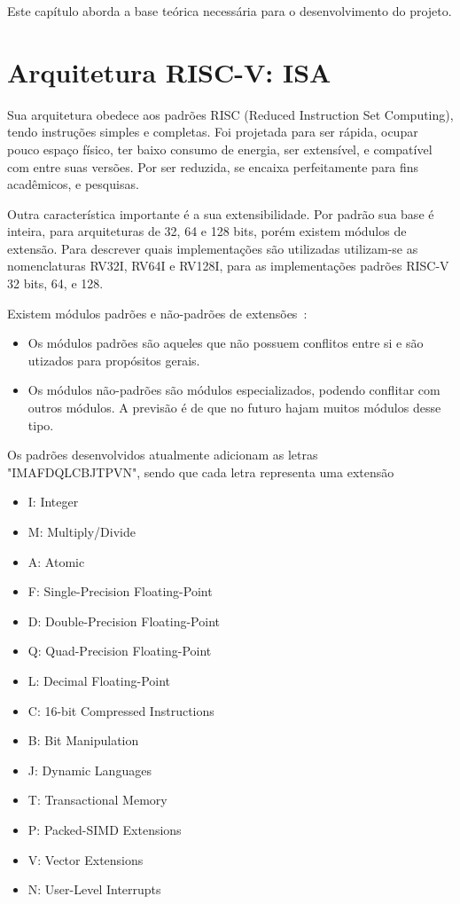 Este capítulo aborda a base teórica necessária para o desenvolvimento do projeto.

\section{Arquitetura RISC-V: ISA}

	Sua arquitetura obedece aos padrões RISC (Reduced Instruction Set Computing), tendo instruções simples e completas. Foi projetada para ser rápida, ocupar pouco espaço físico, ter baixo consumo de energia, ser extensível, e compatível com entre suas versões. Por ser reduzida, se encaixa perfeitamente para fins acadêmicos, e pesquisas. 

	Outra característica importante é a sua extensibilidade. Por padrão sua base é inteira, para arquiteturas de 32, 64 e 128 bits, porém existem módulos de extensão. Para descrever quais implementações são utilizadas utilizam-se as nomenclaturas RV32I, RV64I e RV128I, para as implementações padrões RISC-V 32 bits, 64, e 128.

	Existem módulos padrões e não-padrões de extensões~\cite{riscv_spec}:

		\begin{itemize}
			\item Os módulos padrões são aqueles que não possuem conflitos entre si e são utizados para propósitos gerais.
			\item Os módulos não-padrões são módulos especializados, podendo conflitar com outros módulos. A previsão é de que no futuro hajam muitos módulos desse tipo.
		\end{itemize}

	Os padrões desenvolvidos atualmente adicionam as letras "IMAFDQLCBJTPVN", sendo que cada letra representa uma extensão

		\begin{itemize}
			\item I: Integer
			\item M: Multiply/Divide
			\item A: Atomic
			\item F: Single-Precision Floating-Point
			\item D: Double-Precision Floating-Point
			\item Q: Quad-Precision Floating-Point
			\item L: Decimal Floating-Point
			\item C: 16-bit Compressed Instructions
			\item B: Bit Manipulation
			\item J: Dynamic Languages
			\item T: Transactional Memory
			\item P: Packed-SIMD Extensions
			\item V: Vector Extensions 
			\item N: User-Level Interrupts 
		\end{itemize}

